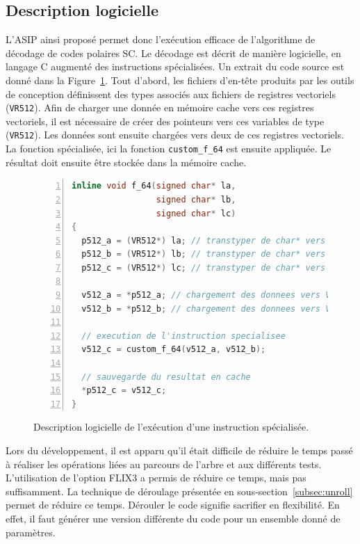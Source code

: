 \subsection{Description logicielle}
L'ASIP ainsi proposé permet donc l'exécution efficace de l'algorithme de décodage de codes polaires SC. Le décodage est décrit de manière logicielle, en langage C augmenté des instructions spécialisées. Un extrait du code source est donné dans la Figure~\ref{fig:f_code}. Tout d'abord, les fichiers d'en-tête produits par les outils de conception définissent des types associés aux fichiers de registres vectoriels (\texttt{VR512}). Afin de charger une donnée en mémoire cache vers ces registres vectoriels, il est nécessaire de créer des pointeurs vers ces variables de type (\texttt{VR512}). Les données sont ensuite chargées vers deux de ces registres vectoriels. La fonction spécialisée, ici la fonction \texttt{custom\_f\_64} est ensuite appliquée. Le résultat doit ensuite être stockée dans la mémoire cache.
\begin{figure}[hb]
\begin{lstlisting}[language=C++, numbers=left, numbersep=0.3em, tabsize=2, basicstyle=\footnotesize\ttfamily]
inline void f_64(signed char* la, 
                 signed char* lb, 
                 signed char* lc)
{
  p512_a = (VR512*) la; // transtyper de char* vers VR512
  p512_b = (VR512*) lb; // transtyper de char* vers VR512
  p512_c = (VR512*) lc; // transtyper de char* vers VR512

  v512_a = *p512_a; // chargement des donnees vers VR512
  v512_b = *p512_b; // chargement des donnees vers VR512
  
  // execution de l'instruction specialisee
  v512_c = custom_f_64(v512_a, v512_b); 
  
  // sauvegarde du resultat en cache
  *p512_c = v512_c;     
}
\end{lstlisting}
\caption{Description logicielle de l'exécution d'une instruction spécialisée.}
\label{fig:f_code}
\end{figure}

Lors du développement, il est apparu qu'il était difficile de réduire le temps passé à réaliser les opérations liées au parcours de l'arbre et aux différents tests. L'utilisation de l'option FLIX3 a permis de réduire ce temps, mais pas suffisamment. La technique de déroulage présentée en sous-section~\ref{subsec:unroll} permet de réduire ce temps. Dérouler le code signifie sacrifier en flexibilité. En effet, il faut générer une version différente du code pour un ensemble donné de paramètres.


